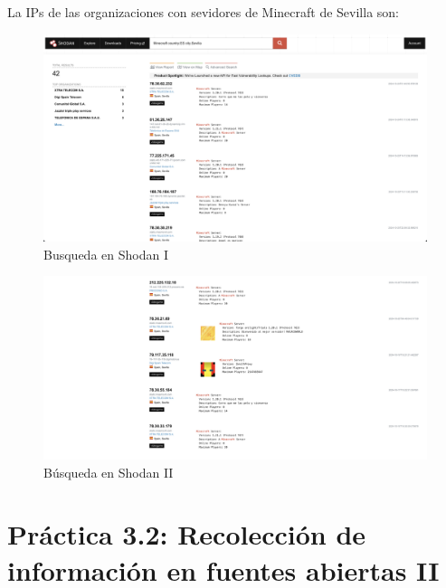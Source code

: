 \documentclass[12pt]{book}
\begin{document}
La IPs de las organizaciones con sevidores de Minecraft de Sevilla son:

\begin{figure}[h]
    \centering
    \includegraphics[width=.7\linewidth]{Practica 3y4/images/Screenshot 2024-10-24 at 10.52.06.png}
    \caption{Busqueda en Shodan I}
    \label{fig:enter-label}
\end{figure}
\newpage
\begin{figure}[h]
    \centering
    \includegraphics[width=.7\linewidth]{Practica 3y4/images/Screenshot 2024-10-24 at 10.52.16.png}
    \caption{Búsqueda en Shodan II}
    \label{fig:enter-label}
\end{figure}

\chapter{Práctica 3.2: Recolección de información en fuentes abiertas II}
\end{document}

